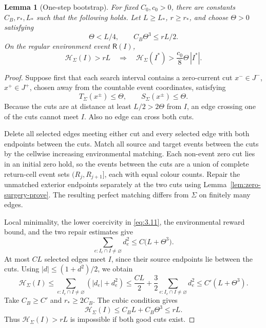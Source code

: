 \documentclass[11pt,reqno]{amsart}
\newtheorem{lemma}[theorem]{Lemma}
\theoremstyle{definition}
\theoremstyle{remark}
\numberwithin{equation}{section}
\begin{document}
\begin{lemma}[One-step bootstrap]
\label{lem:one-step-bootstrap-prove}
For fixed \(C_0,c_0>0\), there are constants \(C_B,r_*,L_*\) such that
the following holds. Let \(L\ge L_*\), \(r\ge r_*\), and choose
\(\Theta>0\) satisfying
\begin{equation}
\Theta<L/4,\qquad C_B\Theta^3\le rL/2.
\label{eq:8.13}
\end{equation}
On the regular environment event \(\mathsf R(I)\),
\begin{equation}
\mathcal H_\Sigma(I)>rL
\quad\Longrightarrow\quad
\mathcal H_\Sigma(I^*)>\frac{c_0}{8}\Theta\,|I^*|.
\label{eq:8.14}
\end{equation}
\end{lemma}

\begin{proof}
Suppose first that each search interval contains a zero-current cut \(x^-\in J^-\),
\(x^+\in J^+\), chosen away from the countable event coordinates, satisfying
\begin{equation}
T_\Sigma(x^\pm)\le\Theta,
\qquad
S_\Sigma(x^\pm)\le\Theta.
\label{eq:8.15}
\end{equation}
Because the cuts are at distance at least \(L/2>2\Theta\) from \(I\), an edge crossing
one of the cuts cannot meet \(I\).  Also no edge can cross both cuts.

Delete all selected edges meeting either cut and every selected edge with
both endpoints between the cuts.  Match all source and target events
between the cuts by the cellwise increasing environmental matching.
Each non-event zero cut lies in an
initial zero hold, so the events between the cuts are a union of complete
return-cell event sets \((R_j,R_{j+1}]\), each with equal colour counts.
Repair the unmatched exterior endpoints separately at the two cuts using
Lemma~\ref{lem:zero-surgery-prove}.  The resulting perfect matching differs from
\(\Sigma\) on finitely many edges.

Local minimality, the lower coercivity in \eqref{eq:3.11}, the environmental reward bound, and
the two repair estimates give
\begin{equation}
\sum_{e:I_e\cap I\ne\varnothing}d_e^2
\le C\bigl(L+\Theta^3\bigr).
\label{eq:8.16}
\end{equation}
At most \(CL\) selected edges meet \(I\), since their source endpoints
lie between the cuts.  Using \(|d|\le(1+d^2)/2\), we obtain
\begin{equation}
\mathcal H_\Sigma(I)
\le\sum_{e:I_e\cap I\ne\varnothing}(|d_e|+d_e^2)
\le \frac{CL}{2}
+\frac32\sum_{e:I_e\cap I\ne\varnothing}d_e^2
\le C'(L+\Theta^3).
\label{eq:8.17}
\end{equation}
Take \(C_B\ge C'\) and \(r_*\ge2C_B\). The cubic condition gives
\begin{equation}
\mathcal H_\Sigma(I)\le C_BL+C_B\Theta^3\le rL.
\label{eq:8.18}
\end{equation}
Thus \(\mathcal H_\Sigma(I)>rL\) is impossible if both good cuts exist.


\end{proof}
\end{document}

